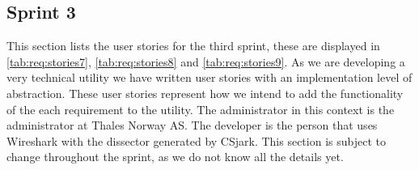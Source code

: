 \subsection{Sprint 3}
\label{sec:req:stories3}
This section lists the user stories for the third sprint, these are displayed in \autoref{tab:req:stories7}, \autoref{tab:req:stories8} and \autoref{tab:req:stories9}.
As we are developing a very technical utility we have written user stories with an implementation level of abstraction. 
These user stories represent how we intend to add the functionality of the each requirement to the utility.
The administrator in this context is the administrator at Thales Norway AS. 
The developer is the person that uses Wireshark with the dissector generated by CSjark.
This section is subject to change throughout the sprint, as we do not know all the details yet.


